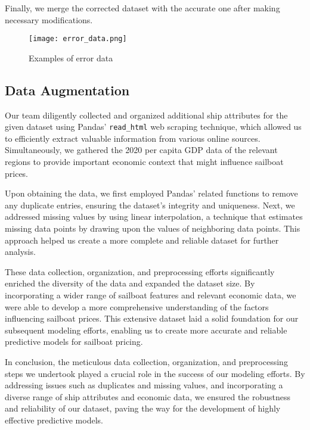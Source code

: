 \documentclass[12pt]{article}  %
\begin{document}
Finally, we merge the corrected dataset with the accurate one after making necessary modifications.
\begin{figure}[htbp]
    \centering
    \texttt{[image: error\_data.png]}
    \caption{Examples of error data}\label{fig:error_data}
\end{figure}

\subsection{Data Augmentation}

Our team diligently collected and organized additional ship attributes for the given dataset using Pandas' \texttt{read\_html} web scraping technique,
which allowed us to efficiently extract valuable information from various online sources. 
Simultaneously, we gathered the 2020 per capita GDP data of the relevant regions to provide important economic context that might influence sailboat prices.

Upon obtaining the data, we first employed Pandas' related functions to remove any duplicate entries, 
ensuring the dataset's integrity and uniqueness. 
Next, we addressed missing values by using linear interpolation, 
a technique that estimates missing data points by drawing upon the values of neighboring data points. 
This approach helped us create a more complete and reliable dataset for further analysis.

These data collection, organization, and preprocessing efforts significantly enriched the diversity of the data and expanded the dataset size.
By incorporating a wider range of sailboat features and relevant economic data, we were able to develop a more comprehensive understanding of the factors influencing sailboat prices. 
This extensive dataset laid a solid foundation for our subsequent modeling efforts, enabling us to create more accurate and reliable predictive models for sailboat pricing.

In conclusion, the meticulous data collection, organization, and preprocessing steps we undertook played a crucial role in the success of our modeling efforts. 
By addressing issues such as duplicates and missing values, and incorporating a diverse range of ship attributes and economic data,
we ensured the robustness and reliability of our dataset, paving the way for the development of highly effective predictive models.
\end{document}
